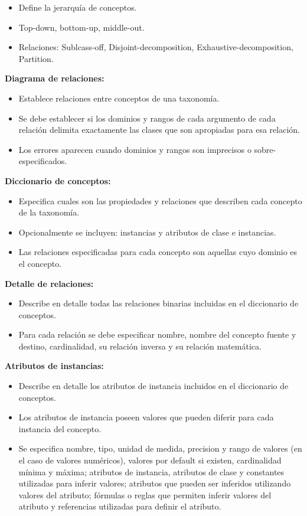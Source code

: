 \documentclass[a4paper,10pt,spanish,oneside]{article}
\begin{document}
\begin{itemize}
\item Define la jerarquía de conceptos.
\item Top-down, bottom-up, middle-out.
\item Relaciones: Sublcass-off, Disjoint-decomposition, Exhaustive-decomposition, Partition.
\end{itemize}

\textbf{Diagrama de relaciones:}

\begin{itemize}
\item Establece relaciones entre conceptos de una taxonomía.
\item Se debe establecer si los dominios y rangos de cada argumento de cada relación delimita exactamente las clases que son apropiadas para esa relación.
\item Los errores aparecen cuando dominios y rangos son imprecisos o sobre-especificados.
\end{itemize}

\textbf{Diccionario de conceptos:}

\begin{itemize}
\item Especifica cuales son las propiedades y relaciones que describen cada concepto de la taxonomía.
\item Opcionalmente se incluyen: instancias y atributos de clase e instancias.
\item Las relaciones especificadas para cada concepto son aquellas cuyo dominio es el concepto.
\end{itemize}

\textbf{Detalle de relaciones:}

\begin{itemize}
\item Describe en detalle todas las relaciones binarias incluidas en el diccionario de conceptos.
\item Para cada relación se debe especificar nombre, nombre del concepto fuente y destino, cardinalidad, su relación inversa y su relación matemática.
\end{itemize}

\textbf{Atributos de instancias:}

\begin{itemize}
\item Describe en detalle los atributos de instancia incluidos en el diccionario de conceptos.
\item Los atributos de instancia poseen valores que pueden diferir para cada instancia del concepto.
\item Se especifica nombre, tipo, unidad de medida, precision y rango de valores (en el caso de valores numéricos), valores por default si existen, cardinalidad mínima y máxima; atributos de instancia, atributos de clase y constantes utilizadas para inferir valores; atributos que pueden ser inferidos utilizando valores del atributo; fórmulas o reglas que permiten inferir valores del atributo y referencias utilizadas para definir el atributo.
\end{itemize}
\end{document}

